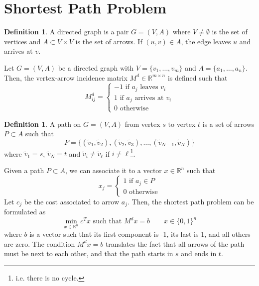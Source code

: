 \documentclass[11pt, openany]{report}
\newcommand{\R}{\mathbb{R}}
\theoremstyle{definition}
\newtheorem{definition}[thm]{Definition}
\begin{document}
\section{Shortest Path Problem}
\begin{definition}
    A directed graph is a pair \(G=(V,A)\) where \(V\neq \emptyset\) is the set of vertices and \(A\subset V\times V\) is the set of arrows. If \((u,v)\in A\), the edge leaves \(u\) and arrives at \(v\).
\end{definition}
Let \(G=(V,A)\) be a directed graph with \(V=\{v_1,\dots,v_m\}\) and \(A=\{a_1,\dots,a_n\}\). Then, the vertex-arrow incidence matrix \(M^d\in \R^{m\times n}\) is defined such that 
\begin{equation}
    M_{ij}^d = \begin{cases}
        -1 \text{ if }a_j \text{ leaves }v_i\\
        1 \text{ if }a_j \text{ arrives at }v_i\\
        0 \text{ otherwise}
    \end{cases}
\end{equation}
\begin{definition}
    A path on \(G=(V,A)\) from vertex \(s\) to vertex \(t\) is a set of arrows \(P\subset A\) such that 
    \begin{equation}
        P=\{(\tilde v_1,\tilde v_2), (\tilde v_2,\tilde v_3), \dots, (\tilde v_{N-1},\tilde v_N)\}
    \end{equation}
    where \(\tilde v_1= s\), \(\tilde v_N=t\) and \(\tilde v_i\neq \tilde v_\ell\) if \(i\neq \ell\)\footnote{i.e. there is no cycle.}.
\end{definition}
Given a path \(P\subset A\), we can associate it to a vector \(x\in \R^n\) such that 
\begin{equation}
    x_j=\begin{cases}
        1\text{ if }a_j\in P\\
        0\text{ otherwise}
    \end{cases}
\end{equation}
Let \(c_j\) be the cost associated to arrow \(a_j\). Then, the shortest path problem can be formulated as 
\begin{equation}\label{eq:spp}
    \min_{x\in \R^n}c^Tx \text{   such that   }M^dx=b\qquad x\in \{0,1\}^n
\end{equation}
where \(b\) is a vector such that its first component is -1, its last is 1, and all others are zero. The condition \(M^dx=b\) translates the fact that all arrows of the path must be next to each other, and that the path starts in \(s\) and ends in \(t\). 
\end{document}
